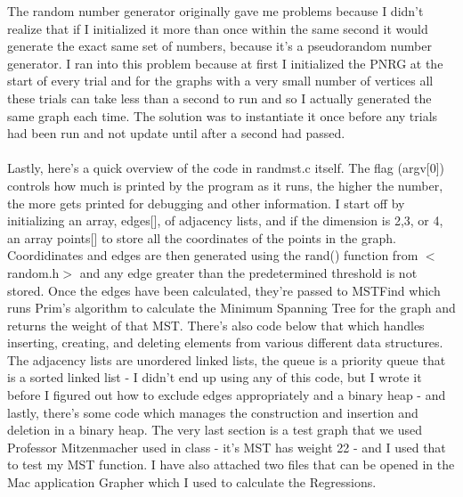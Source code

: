 \documentclass{article}
\begin{document}
The random number generator originally gave me problems because I didn't realize that if I initialized it more than once within the same second it would generate the exact same set of numbers, because it's a pseudorandom number generator.  I ran into this problem because at first I initialized the PNRG at the start of every trial and for the graphs with a very small number of vertices all these trials can take less than a second to run and so I actually generated the same graph each time.  The solution was to instantiate it once before any trials had been run and not update until after a second had passed.  \\\\

Lastly, here's a quick overview of the code in randmst.c itself.  The flag (argv[0]) controls how much is printed by the program as it runs, the higher the number, the more gets printed for debugging and other information.  I start off by initializing an array, edges[], of adjacency lists, and if the dimension is 2,3, or 4, an array points[] to store all the coordinates of the points in the graph.  Coordidinates and edges are then generated using the rand() function from $<$random.h$>$ and any edge greater than the predetermined threshold is not stored.  Once the edges have been calculated, they're passed to MSTFind which runs Prim's algorithm to calculate the Minimum Spanning Tree for the graph and returns the weight of that MST. There's also code below that which handles inserting, creating, and deleting elements from various different data structures.  The adjacency lists are unordered linked lists, the queue is a priority queue that is a sorted linked list - I didn't end up using any of this code, but I wrote it before I figured out how to exclude edges appropriately and a binary heap - and lastly, there's some code which manages the construction and insertion and deletion in a binary heap.  The very last section is a test graph that we used Professor Mitzenmacher used in class - it's MST has weight 22 - and I used that to test my MST function. I have also attached two files that can be opened in the Mac application Grapher which I used to calculate the Regressions. \\\\ 
\end{document}
